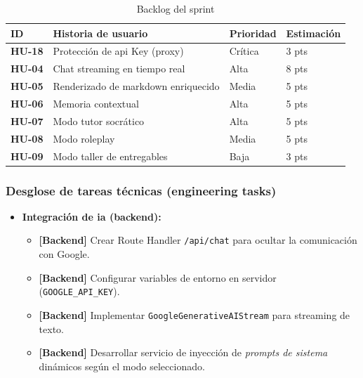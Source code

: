 \begin{table}[h]
\centering
\begin{tabularx}{0.95\textwidth}{|l|X|l|l|}
\hline
\textbf{ID} & \textbf{Historia de usuario} & \textbf{Prioridad} & \textbf{Estimación} \\
\hline
\textbf{HU-18} & Protección de \gls{api} Key (proxy) & Crítica & 3 pts \\
\hline
\textbf{HU-04} & Chat streaming en tiempo real & Alta & 8 pts \\
\hline
\textbf{HU-05} & Renderizado de markdown enriquecido & Media & 5 pts \\
\hline
\textbf{HU-06} & Memoria contextual & Alta & 5 pts \\
\hline
\textbf{HU-07} & Modo tutor socrático & Alta & 5 pts \\
\hline
\textbf{HU-08} & Modo roleplay & Media & 5 pts \\
\hline
\textbf{HU-09} & Modo taller de entregables & Baja & 3 pts \\
\hline
\end{tabularx}
\caption{Backlog del sprint}
\label{tab:backlog_sprint2}
\end{table}

\subsubsection{Desglose de tareas técnicas (engineering tasks)}

\begin{itemize}
\item \textbf{Integración de \gls{ia} (backend):}
\begin{itemize}
\item \textbf{[Backend]} Crear Route Handler \texttt{/api/chat} para ocultar la comunicación con Google.
\item \textbf{[Backend]} Configurar variables de entorno en servidor (\texttt{GOOGLE\_API\_KEY}).
\item \textbf{[Backend]} Implementar \texttt{GoogleGenerativeAIStream} para streaming de texto.
\item \textbf{[Backend]} Desarrollar servicio de inyección de \textit{prompts de sistema} dinámicos según el modo seleccionado.
\end{itemize}
\end{itemize}

